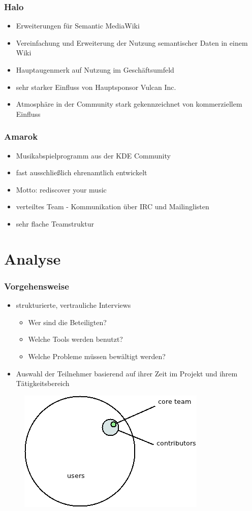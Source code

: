 \documentclass{beamer}
\begin{document}
\begin{frame}
\frametitle{Halo}
\begin{itemize}
 \item Erweiterungen f\"ur Semantic MediaWiki
 \item Vereinfachung und Erweiterung der Nutzung semantischer Daten in einem Wiki
 \item Hauptaugenmerk auf Nutzung im Gesch\"aftsumfeld
 \item sehr starker Einfluss von Hauptsponsor Vulcan Inc.
 \item Atmosph\"are in der Community stark gekennzeichnet von kommerziellem Einfluss
\end{itemize}
\end{frame}

\begin{frame}
\frametitle{Amarok}
\begin{itemize}
 \item Musikabspielprogramm aus der KDE Community
 \item fast ausschlie\ss lich ehrenamtlich entwickelt
 \item Motto: rediscover your music
 \item verteiltes Team - Kommunikation \"uber IRC und Mailinglisten
 \item sehr flache Teamstruktur
\end{itemize}
\end{frame}

\section{Analyse}

\begin{frame}
\frametitle{Vorgehensweise}
\begin{itemize}
 \item strukturierte, vertrauliche Interviews
     \begin{itemize}
        \item Wer sind die Beteiligten?
        \item Welche Tools werden benutzt?
        \item Welche Probleme m\"ussen bew\"altigt werden?
     \end{itemize}
 \item Auswahl der Teilnehmer basierend auf ihrer Zeit im Projekt und ihrem T\"atigkeitsbereich
\end{itemize}
\begin{figure}[h!]
 \centering
 \includegraphics[scale=0.35,keepaspectratio=true]{./communitymodel.png}
\end{figure}
\end{frame}
\end{document}
